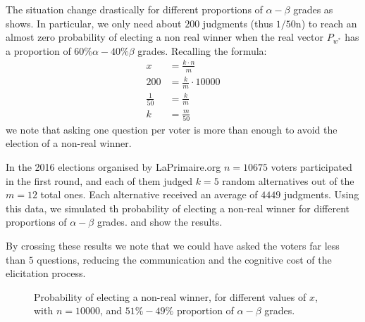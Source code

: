 \documentclass[version=3.21, pagesize, twoside=off, bibliography=totoc, DIV=calc, fontsize=12pt, a4paper]{scrartcl}
\begin{document}
The situation change drastically for different proportions of $\alpha-\beta$ grades as  shows. In particular, we only need about $200$ judgments (thus $1/50$n) to reach an almost zero probability of electing a non real winner when the real vector $P_{w^*}$ has a proportion of $60\% \alpha -40\% \beta$ grades. Recalling the formula:
\begin{align}
	x&=\frac{k \cdot n}{m} \\
	200&=\frac{k}{m}\cdot 10000 \\
	\frac{1}{50}&=\frac{k}{m} \\
	k&=\frac{m}{50}
\end{align}
we note that asking one question per voter is more than enough to avoid the election of a non-real winner.

In the 2016 elections organised by LaPrimaire.org $n=10675$ voters participated in the first round, and each of them judged $k=5$ random alternatives out of the $m=12$ total ones. Each alternative received an average of $4449$ judgments. Using this data, we simulated th probability of electing a non-real winner for different proportions of $\alpha-\beta$ grades.  and  show the results.

By crossing these results we note that we could have asked the voters far less than $5$ questions, reducing the communication and the cognitive cost of the elicitation process.

\begin{figure}
	\centering
	\caption{Probability of electing a non-real winner, for different values of $x$, with $n=10000$, and $51\%-49\%$ proportion of $\alpha - \beta$ grades.}
	\label{fig:differentX51-49}
\end{figure}
\end{document}
